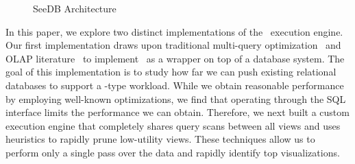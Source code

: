 \begin{figure}[htb]
\vspace{-10pt}
\centerline{
\hbox{}}
\vspace{-15pt}
\caption{SeeDB Architecture}
\label{fig:sys-arch}
\vspace{-15pt}
\end{figure} 

In this paper, we explore two distinct implementations of the \SeeDB\ execution
engine. 
Our first implementation draws upon traditional multi-query optimization~\cite{}
and OLAP literature~\cite{} to implement \SeeDB\ as a wrapper
on top of a database system. 
The goal of this implementation is to study how far we can push existing 
relational databases to support a \SeeDB-type workload.
While we obtain reasonable performance by employing well-known optimizations, we find that 
operating through the SQL interface limits the performance we can obtain.
Therefore, we next built a custom execution engine that completely shares query scans between
all views and uses heuristics to rapidly prune low-utility views.
These techniques allow us to perform only a single pass over the data
and rapidly identify top visualizations. 

